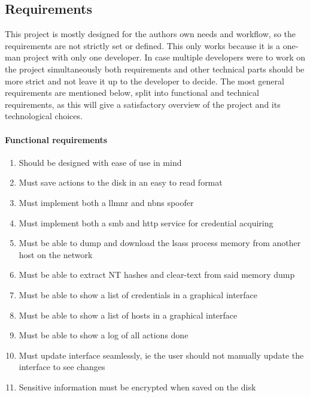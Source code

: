 \documentclass{article}
\begin{document}
\subsection{Requirements}
\label{sec:requirements}
This project is mostly designed for the authors own needs and workflow, so the requirements are not strictly set or defined. This only works because it is a one-man project with only one developer. In case multiple developers were to work on the project simultaneously both requirements and other technical parts should be more strict and not leave it up to the developer to decide. The most general requirements are mentioned below, split into functional and technical requirements, as this will give a satisfactory overview of the project and its technological choices.
\paragraph{Functional requirements}
\begin{enumerate}
    \item Should be designed with ease of use in mind
    \item Must save actions to the disk in an easy to read format
    \item Must implement both a \gls{llmnr} and \gls{nbns} spoofer
    \item Must implement both a \gls{smb} and \gls{http} service for credential acquiring
    \item Must be able to dump and download the \gls{lsass} process memory from another host on the network
    \item Must be able to extract NT hashes and clear-text from said memory dump
    \item Must be able to show a list of credentials in a graphical interface
    \item Must be able to show a list of hosts in a graphical interface
    \item Must be able to show a log of all actions done
    \item Must update interface seamlessly, ie the user should not manually update the interface to see changes
    \item Sensitive information must be encrypted when saved on the disk
\end{enumerate}
\end{document}
